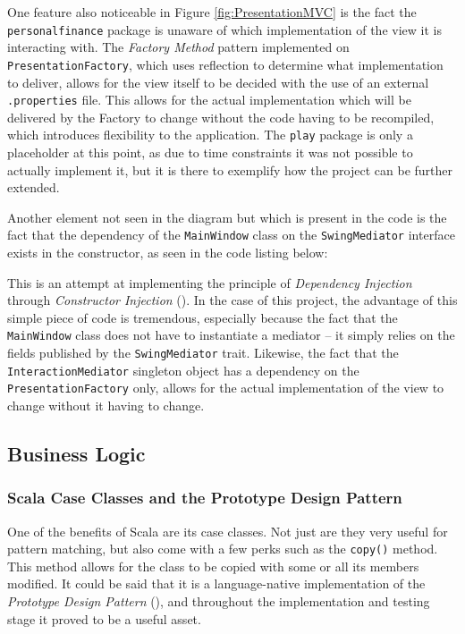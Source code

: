 One feature also noticeable in Figure \ref{fig:PresentationMVC} is the fact the
\texttt{personalfinance} package is unaware of which implementation of the view
it is interacting with. The \emph{Factory Method} pattern implemented on
\texttt{PresentationFactory}, which uses reflection to determine what
implementation to deliver, allows for the view itself to be decided with the
use of an external \texttt{.properties} file. This allows for the actual
implementation which will be delivered by the Factory to change without the
code having to be recompiled, which introduces flexibility to the application.
The \texttt{play} package is only a placeholder at this point, as due to time
constraints it was not possible to actually implement it, but it is there to
exemplify how the project can be further extended.

Another element not seen in the diagram but which is present in the code is the
fact that the dependency of the \texttt{MainWindow} class on the
\texttt{SwingMediator} interface exists in the constructor, as seen in the code
listing below:
{
  \small
  
}

This is an attempt at implementing the principle of \emph{Dependency Injection}
through \emph{Constructor Injection} (\cite[][]{fowler2004inversion}). In the
case of this project, the advantage of this simple piece of code is tremendous,
especially because the fact that the \texttt{MainWindow} class does not have to
instantiate a mediator -- it simply relies on the fields published by the
\texttt{SwingMediator} trait. Likewise, the fact that the
\texttt{InteractionMediator} singleton object has a dependency on the
\texttt{PresentationFactory} only, allows for the actual implementation of the
view to change without it having to change.


\subsection{Business Logic} \label{sec:Implementation.BusinessLogic}

\subsubsection{Scala Case Classes and the Prototype Design Pattern} \label{sec:Implementation.ScalaCaseClasses}
One of the benefits of Scala are its case classes. Not just are they very
useful for pattern matching, but also come with a few perks such as the
\texttt{copy()} method. This method allows for the class to be copied with some
or all its members modified. It could be said that it is a language-native
implementation of the \emph{Prototype Design Pattern}
(\cite[][Ch.~6,~Location~2461]{nikolov2016scala}), and throughout the
implementation and testing stage it proved to be a useful asset.

